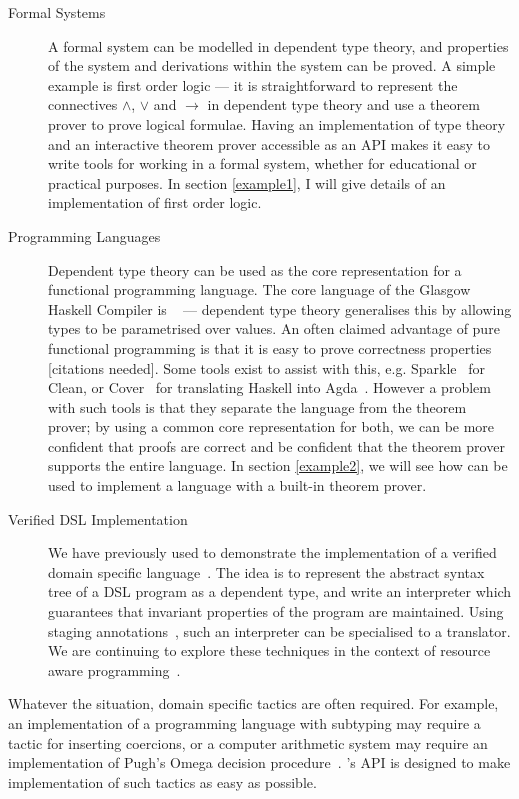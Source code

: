 \begin{description}
\item[Formal Systems] 
A formal system can be modelled in dependent type theory, and
properties of the system and derivations within the system can be
proved. A simple example is first order logic --- it is
straightforward to represent the connectives $\land$, $\lor$ and $\to$
in dependent type theory and use a theorem prover to prove logical
formulae.
Having an implementation of type theory and an interactive theorem
prover accessible as an API makes it easy to write tools for working
in a formal system, whether for educational or practical purposes.
In section \ref{example1}, I will give details of an implementation of
first order logic.

\item[Programming Languages] 
Dependent type theory can be used as the core representation for a
functional programming language. The core language of the Glasgow
Haskell Compiler is \SystemF{}~\cite{core} --- dependent type theory
generalises this by allowing types to be parametrised over values.  An
often claimed advantage of pure functional programming is that it is
easy to prove correctness properties [citations needed]. Some tools
exist to assist with this, e.g. Sparkle~\cite{sparkle} for Clean, or
Cover~\cite{cover} for translating Haskell into Agda~\cite{agda}. However a
problem with such tools is that they separate the language from the
theorem prover; by using a common core representation for both, we can
be more confident that proofs are correct and be confident that the
theorem prover supports the entire language.
In section \ref{example2}, we will see how \Ivor{} can be used to
implement a language with a built-in theorem prover.

\item[Verified DSL Implementation]
We have previously used \Ivor{} to demonstrate the implementation of
a verified domain specific language~\cite{dtpmsp-gpce}. The idea is to
represent the abstract syntax tree of a DSL program as a dependent
type, and write an interpreter which guarantees that invariant
properties of the program are maintained. Using staging
annotations~\cite{multi-taha}, such an interpreter can be specialised
to a translator. We are continuing to explore these techniques in the
context of resource aware programming~\cite{dt-framework}.

\end{description}

Whatever the situation, domain specific tactics are often
required. For example, 
an implementation of a programming language with subtyping may require
a tactic for inserting coercions, or
a computer arithmetic system may require an
implementation of Pugh's Omega decision procedure~\cite{pugh-omega}.
\Ivor{}'s API is designed to make implementation of such tactics as
easy as possible.


